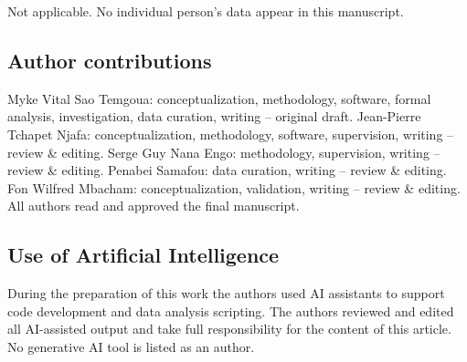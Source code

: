 \documentclass[pdflatex,sn-mathphys-num]{sn-jnl}%
\begin{document}
Not applicable. No individual person's data appear in this manuscript.

\subsection*{Author contributions}

Myke Vital Sao Temgoua: conceptualization, methodology, software, formal analysis, investigation, data curation, writing -- original draft. Jean-Pierre Tchapet Njafa: conceptualization, methodology, software, supervision, writing -- review \& editing. Serge Guy Nana Engo: methodology, supervision, writing -- review \& editing. Penabei Samafou: data curation, writing -- review \& editing. Fon Wilfred Mbacham: conceptualization, validation, writing -- review \& editing. All authors read and approved the final manuscript.

\subsection*{Use of Artificial Intelligence}

During the preparation of this work the authors used AI assistants to support code development and data analysis scripting. The authors reviewed and edited all AI-assisted output and take full responsibility for the content of this article. No generative AI tool is listed as an author.



\end{document}
